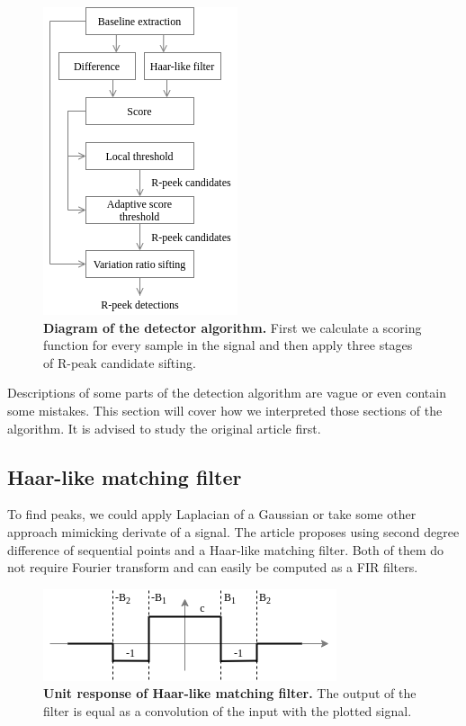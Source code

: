 \documentclass[fleqn,moreauthors,10pt]{ds_report}
\begin{document}
\begin{figure}[ht]\centering
	\includegraphics[width=0.6\linewidth]{ding-detector-diagram.png}
	\caption{\textbf{Diagram of the detector algorithm.} First we calculate a scoring function for every sample in the signal and then apply three stages of R-peak candidate sifting.}
	\label{fig:diagram}
\end{figure}

Descriptions of some parts of the detection algorithm are vague or even contain some mistakes. This section will cover how we interpreted those sections of the algorithm. It is advised to study the original article first.

\subsection*{Haar-like matching filter}

To find peaks, we could apply Laplacian of a Gaussian or take some other approach mimicking derivate of a signal. The article proposes using second degree difference of sequential points and a Haar-like matching filter. Both of them do not require Fourier transform and can easily be computed as a FIR filters.

\begin{figure}[!ht]\centering
	\includegraphics[width=0.8\linewidth]{haar-like.png}
	\caption{\textbf{Unit response of Haar-like matching filter.} The output of the filter is equal as a convolution of the input with the plotted signal.}
	\label{fig:haar-like}
\end{figure}
\end{document}
